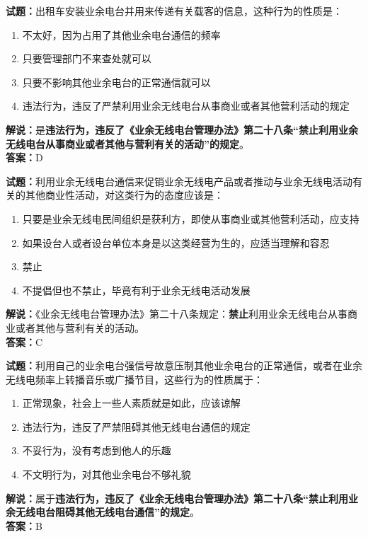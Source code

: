 \documentclass{ctexbook}
\begin{document}
\bigskip

\noindent\textbf{试题：}出租车安装业余电台并用来传递有关载客的信息，这种行为的性质是：
\begin{enumerate}[leftmargin=3em]
  \item 不太好，因为占用了其他业余电台通信的频率
  \item 只要管理部门不来查处就可以
  \item 只要不影响其他业余电台的正常通信就可以
  \item 违法行为，违反了严禁利用业余无线电台从事商业或者其他营利活动的规定%
\end{enumerate}
\noindent\textbf{解说：}是\textbf{违法行为，违反了《业余无线电台管理办法》第二十八条“禁止利用业余无线电台从事商业或者其他与营利有关的活动”的规定}。\\\noindent\textbf{答案：}D

\bigskip

\noindent\textbf{试题：}利用业余无线电台通信来促销业余无线电产品或者推动与业余无线电活动有关的其他商业性活动，对这类行为的态度应该是：
\begin{enumerate}[leftmargin=3em]
  \item 只要是业余无线电民间组织是获利方，即使从事商业或其他营利活动，应支持
  \item 如果设台人或者设台单位本身是以这类经营为生的，应适当理解和容忍
  \item 禁止
  \item 不提倡但也不禁止，毕竟有利于业余无线电活动发展
\end{enumerate}
\noindent\textbf{解说：}《业余无线电台管理办法》第二十八条规定：\textbf{禁止}利用业余无线电台从事商业或者其他与营利有关的活动。\\\noindent\textbf{答案：}C

\bigskip

\noindent\textbf{试题：}利用自己的业余电台强信号故意压制其他业余电台的正常通信，或者在业余无线电频率上转播音乐或广播节目，这些行为的性质属于：
\begin{enumerate}[leftmargin=3em]
  \item 正常现象，社会上一些人素质就是如此，应该谅解
  \item 违法行为，违反了严禁阻碍其他无线电台通信的规定
  \item 不妥行为，没有考虑到他人的乐趣
  \item 不文明行为，对其他业余电台不够礼貌
\end{enumerate}
\noindent\textbf{解说：}属于\textbf{违法行为，违反了《业余无线电台管理办法》第二十八条“禁止利用业余无线电台阻碍其他无线电台通信”的规定}。\\\noindent\textbf{答案：}B
\end{document}
